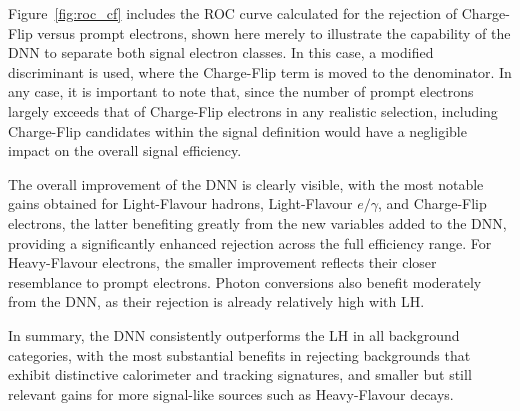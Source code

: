 Figure~\ref{fig:roc_cf} includes the ROC curve calculated for the rejection of Charge-Flip versus prompt electrons, shown here merely to illustrate the capability of the DNN to separate both signal electron classes. In this case, a modified discriminant is used, where the Charge-Flip term is moved to the denominator. In any case, it is important to note that, since the number of prompt electrons largely exceeds that of Charge-Flip electrons in any realistic selection, including Charge-Flip candidates within the signal definition would have a negligible impact on the overall signal efficiency.

The overall improvement of the DNN is clearly visible, with the most notable gains obtained for Light-Flavour hadrons, Light-Flavour $e/\gamma$, and Charge-Flip electrons, the latter benefiting greatly from the new variables added to the DNN, providing a significantly enhanced rejection across the full efficiency range. For Heavy-Flavour electrons, the smaller improvement reflects their closer resemblance to prompt electrons. Photon conversions also benefit moderately from the DNN, as their rejection is already relatively high with LH.

In summary, the DNN consistently outperforms the LH in all background categories, with the most substantial benefits in rejecting backgrounds that exhibit distinctive calorimeter and tracking signatures, and smaller but still relevant gains for more signal-like sources such as Heavy-Flavour decays.

